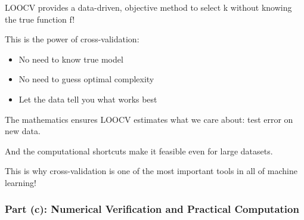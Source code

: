 \documentclass[12pt]{article}
\begin{document}
\begin{explanation}
LOOCV provides a data-driven, objective method to select k without knowing the true function f!

This is the power of cross-validation:
\begin{itemize}
    \item No need to know true model
    \item No need to guess optimal complexity
    \item Let the data tell you what works best
\end{itemize}

The mathematics ensures LOOCV estimates what we care about: test error on new data.

And the computational shortcuts make it feasible even for large datasets.

This is why cross-validation is one of the most important tools in all of machine learning!

\end{explanation}

\subsubsection{Part (c): Numerical Verification and Practical Computation}
\end{document}
